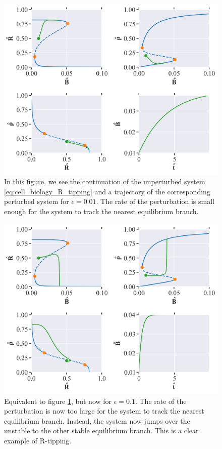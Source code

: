 \begin{figure}[H]
    \centering
    \includegraphics[width= \textwidth]{figures/cb_rtip_R(0)=0.5_rho(0)=0.2_B(0)_0.01_eps=0.01_Bmax=0.04.png}
    \caption{In this figure, we see the continuation of the unperturbed system \ref{eq:cell_biology_R_tipping} and a trajectory of the corresponding perturbed system for $\epsilon = 0.01$.
    The rate of the perturbation is small enough for the system to track the nearest equilibrium branch.}
    \label{fig:cell_biology_R_tipping_small}
\end{figure}

\begin{figure}[H]
    \centering
    \includegraphics[width= \textwidth]{figures/cb_rtip_R(0)=0.5_rho(0)=0.2_B(0)_0.01_eps=0.1_Bmax=0.04.png}
    \caption{Equivalent to figure \ref{fig:cell_biology_R_tipping_small}, but now for $\epsilon = 0.1$. The rate of the perturbation is now too large for the system to track the nearest equilibrium branch.
    Instead, the system now jumps over the unstable to the other stable equilibrium branch. This is a clear example of R-tipping.}
    \label{fig:cell_biology_R_tipping_big}
\end{figure}

